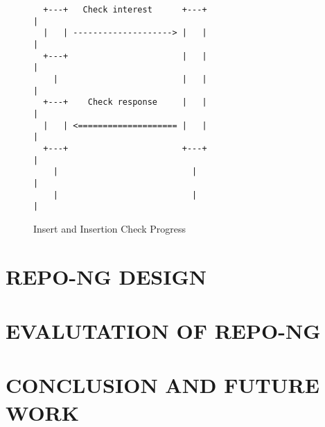 \documentclass{acm_proc_article-sp}
\begin{document}
\begin{figure*}
\begin{BVerbatim}
  +---+   Check interest      +---+                               |
  |   | --------------------> |   |                               |
  +---+                       |   |                               |
    |                         |   |                               |
  +---+    Check response     |   |                               |
  |   | <==================== |   |                               |
  +---+                       +---+                               |
    |                           |                                 |
    |                           |                                 |
\end{BVerbatim}
\caption{Insert and Insertion Check Progress}
\end{figure*}


\section{REPO-NG DESIGN}

\section{EVALUTATION OF REPO-NG}

\section{CONCLUSION AND FUTURE WORK}



\end{document}
